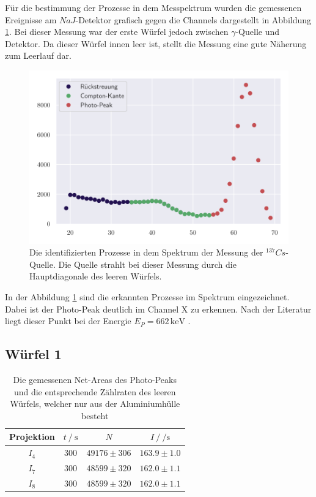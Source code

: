 Für die bestimmung der Prozesse in dem Messpektrum wurden die gemessenen Ereignisse am $NaJ$-Detektor grafisch gegen die Channels dargestellt in Abbildung \ref{fig:leer}. Bei dieser Messung war der erste Würfel jedoch zwischen $\gamma$-Quelle und Detektor. Da dieser Würfel innen leer ist, 
stellt die Messung eine gute Näherung zum Leerlauf dar. 
\begin{figure}[H]
  \centering
  \includegraphics[width = 0.9 \textwidth]{Daten/leerlauf.pdf}
  \caption{Die identifizierten Prozesse in dem Spektrum der Messung der $^{137}Cs$-Quelle. Die Quelle strahlt bei dieser Messung durch die Hauptdiagonale des leeren Würfels. }
  \label{fig:leer}
\end{figure}

In der Abbildung \ref{fig:leer} sind die erkannten Prozesse im Spektrum eingezeichnet. Dabei ist der Photo-Peak deutlich im Channel X zu erkennen. Nach der Literatur liegt dieser Punkt bei der Energie $E_P = 662 \,\si{\kilo\electronvolt}$ \cite{Peak}. 
\subsection{Würfel 1}


\begin{table}[H]
  \centering
  \begin{tabular}{c c c c}
    \toprule
     Projektion &  $t \:/\: \si{\second}$ &                   $N$ &           $I \:/\: \si{\per\second}$ \\
    \midrule
              $I_{4}$ &   $300$ & $49176\pm 306$ & $163.9\pm 1.0$ \\
              $I_{7}$ &   $300$ & $48599\pm 320$ & $162.0\pm 1.1$ \\
              $I_{8}$ &   $300$ & $48599\pm 320$ & $162.0\pm 1.1$ \\
    \bottomrule
  \end{tabular}
  \caption{Die gemessenen Net-Areas des Photo-Peaks und die entsprechende Zählraten des leeren Würfels, welcher nur aus der Aluminiumhülle besteht}
  \label{tab:w1}
\end{table}

